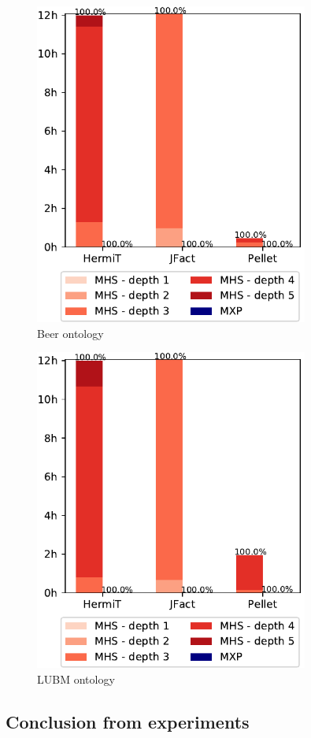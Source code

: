\documentclass[12pt,a4paper]{article}
\begin{document}
\begin{figure}[H]
	\centering
	\includegraphics[width=9cm]{eval2Beer} 
	\caption{Beer ontology}
	\label{fig:eval2Beer}
\end{figure}

\begin{figure}[H]
	\centering
	\includegraphics[width=9cm]{eval2LUBM} 
	\caption{LUBM ontology}
	\label{fig:eval2LUBM}
\end{figure}

\subsection{Conclusion from experiments}
\end{document}
